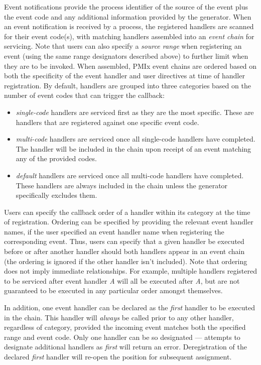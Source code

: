 Event notifications provide the process identifier of the source of the event plus the event code and any additional information provided by the generator. When an event notification is received by a process, the registered handlers are scanned for their event code(s), with matching handlers assembled into an \textit{event chain} for servicing. Note that users can also specify a \textit{source range} when registering an event (using the same range designators described above) to further limit when they are to be invoked. When assembled, PMIx event chains are ordered based on both the specificity of the event handler and user directives at time of handler registration. By default, handlers are grouped into three categories based on the number of event codes that can trigger the callback:
\begin{itemize}
%
\item \textit{single-code} handlers are serviced first as they are the most specific. These are handlers that are registered against one specific event code.
%
\item \textit{multi-code} handlers are serviced once all single-code handlers have completed. The handler will be included in the chain upon receipt of an event matching any of the provided codes.
%
\item \textit{default} handlers are serviced once all multi-code handlers have completed. These handlers are always included in the chain unless the generator specifically excludes them.
%
\end{itemize}

Users can specify the callback order of a handler within its category at the time of registration. Ordering can be specified by providing the relevant event handler names, if the user specified an event handler name when registering the corresponding event. Thus, users can specify that a given handler be executed before or after another handler should both handlers appear in an event chain (the ordering is ignored if the other handler isn't included). Note that ordering does not imply immediate relationships. For example, multiple handlers registered to be serviced after event handler \textit{A} will all be executed after \textit{A}, but are not guaranteed to be executed in any particular order amongst themselves.

In addition, one event handler can be declared as the \textit{first} handler to be executed in the chain. This handler will \textit{always} be called prior to any other handler, regardless of category, provided the incoming event matches both the specified range and event code. Only one handler can be so designated --- attempts to designate additional handlers as \textit{first} will return an error. Deregistration of the declared \textit{first} handler will re-open the position for subsequent assignment.

